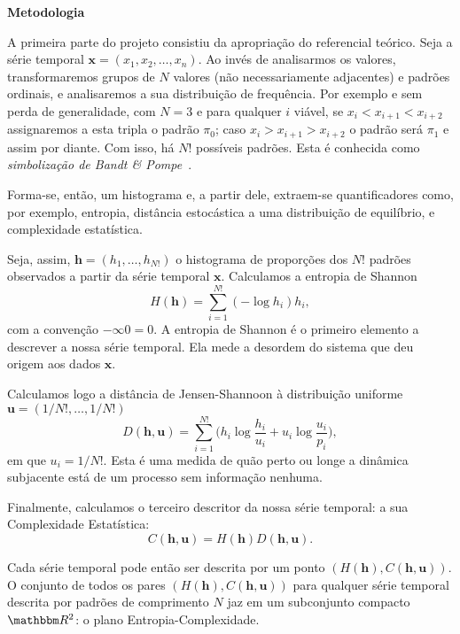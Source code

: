 \documentclass[12pt]{article}
\begin{document}
\textbf{Metodologia}

A primeira parte do projeto consistiu da apropriação do referencial teórico.
Seja a série temporal $\bm x = (x_1, x_2, \dots, x_n)$.
Ao invés de analisarmos os valores, transformaremos grupos de $N$ valores (não necessariamente adjacentes) e padrões ordinais, e analisaremos a sua distribuição de frequência.
Por exemplo e sem perda de generalidade, com $N=3$ e para qualquer $i$ viável,
se $x_i<x_{i+1}<x_{i+2}$ assignaremos a esta tripla o padrão $\pi_0$;
caso $x_i>x_{i+1}>x_{i+2}$ o padrão será $\pi_1$ e assim por diante.
Com isso, há $N!$ possíveis padrões.
Esta é conhecida como \textit{simbolização de Bandt \& Pompe}~\cite{PermutationEntropyBandtPompe}.

Forma-se, então, um histograma e, a partir dele, extraem-se quantificadores como, por exemplo, entropia, distância estocástica a uma distribuição de equilíbrio, e complexidade estatística.

Seja, assim, $\bm h=(h_1,\dots,h_{N!})$ o histograma de proporções dos $N!$ padrões observados a partir da série temporal $\bm x$.
Calculamos a entropia de Shannon
\begin{equation}
H(\bm h) = \sum_{i=1}^{N!} (-\log h_i) h_i,
\label{eq:Entropia}
\end{equation}
com a convenção $-\infty 0=0$.
A entropia de Shannon é o primeiro elemento a descrever a nossa série temporal.
Ela mede a desordem do sistema que deu origem aos dados $\bm x$.

Calculamos logo a distância de Jensen-Shannoon à distribuição uniforme $\bm u=(1/N!,\dots,1/N!)$
\begin{equation}
D(\bm h,\bm u) = \sum_{i=1}^{N!} \Big(h_i \log\frac{h_i}{u_i} +
u_i \log\frac{u_i}{p_i}
\Big),
\end{equation}
em que $u_i=1/N!$.
Esta é uma medida de quão perto ou longe a dinâmica subjacente está de um processo sem informação nenhuma.

Finalmente, calculamos o terceiro descritor da nossa série temporal: a sua Complexidade Estatística:
\begin{equation}
C(\bm h, \bm u) = H(\bm h) D(\bm h, \bm u).
\end{equation}

Cada série temporal pode então ser descrita por um ponto $(H(\bm h), C(\bm h, \bm u))$.
O conjunto de todos os pares $(H(\bm h), C(\bm h, \bm u))$ para qualquer série temporal descrita por padrões de comprimento $N$ jaz em um subconjunto compacto $\mathbbm R^2$: o plano Entropia-Complexidade.
\end{document}
